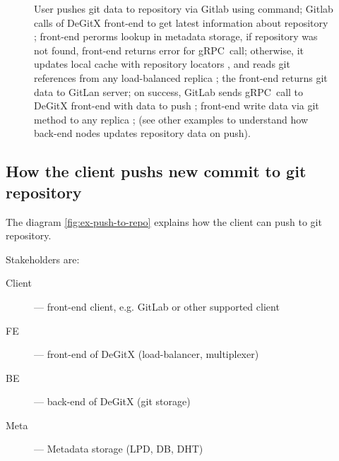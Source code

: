 \begin{figure}
\caption{%
  User pushes git data to repository  via Gitlab using  command;%
  Gitlab calls  of DeGitX front-end to get latest information%
  about repository ; front-end perorms lookup in metadata storage,%
  if repository was not found, front-end returns error for gRPC~call;%
  otherwise, it updates local cache with repository locators , and reads git references from%
  any load-balanced replica ; the front-end returns git data to GitLan server;%
  on success, GitLab sends  gRPC~call to DeGitX front-end with data to push ;%
  front-end write data via  git method to any replica ;%
  (see other examples to understand how back-end nodes updates repository data on push).%
}\label{fig:gitlab-push-gitaly}
\end{figure}

\subsection{How the client pushs new commit to git repository}

The diagram \ref{fig:ex-push-to-repo} explains how the client can push to git repository.

Stakeholders are:
\begin{description}
  \item[Client] --- front-end client, e.g. GitLab or other supported client
  \item[FE] --- front-end of DeGitX (load-balancer, multiplexer)
  \item[BE] --- back-end of DeGitX (git storage)
  \item[Meta] --- Metadata storage (LPD, DB, DHT)
\end{description}


